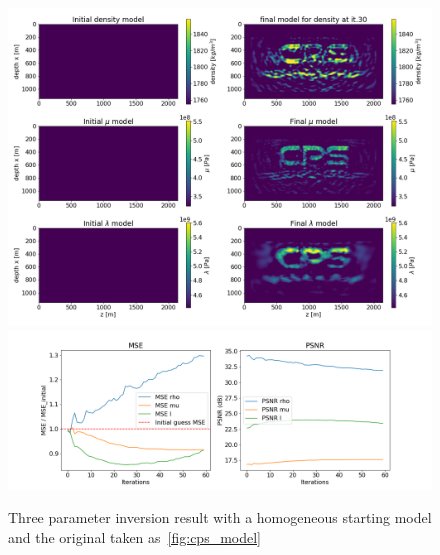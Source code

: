 \documentclass[10pt]{SelfArx} %
\theoremstyle{definition}
\begin{document}
\begin{figure}[!h]\label{fig:cps_fwi_empty_start}
\hspace*{-0.6in}
\includegraphics[width=1.20\textwidth]{fig/cps_fwi_three_params}
\hspace*{-0.6in}
\includegraphics[width=1.20\textwidth]{fig/cps_fwi_three_params_MSE}
\caption{Three parameter inversion result with a homogeneous starting model and the original taken as~\cref{fig:cps_model}}
\end{figure}
\end{document}
